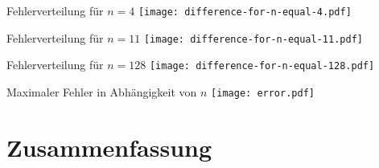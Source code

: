 \documentclass[9pt, t]{beamer}
\begin{document}
\begin{frame}{Fehlerverteilung für \(n = 4\)}
    \centering
    \texttt{[image: difference-for-n-equal-4.pdf]}
\end{frame}

\begin{frame}{Fehlerverteilung für \(n = 11\)}
    \centering
    \texttt{[image: difference-for-n-equal-11.pdf]}
\end{frame}

\begin{frame}{Fehlerverteilung für \(n = 128\)}
    \centering
    \texttt{[image: difference-for-n-equal-128.pdf]}
\end{frame}

\begin{frame}{Maximaler Fehler in Abhängigkeit von \(n\)}
    \centering
    \texttt{[image: error.pdf]}
\end{frame}

%
\section{Zusammenfassung}
\end{document}
